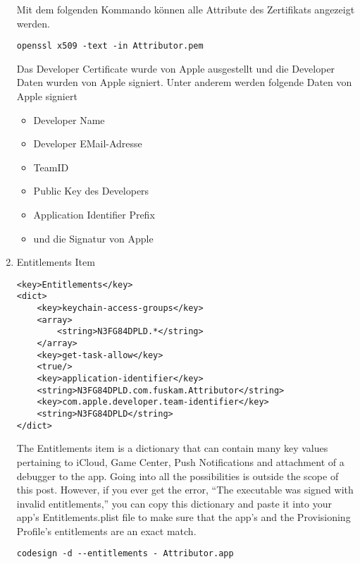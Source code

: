 \begin{enumerate}
Mit dem folgenden Kommando können alle Attribute des Zertifikats angezeigt werden.
\lstset{
    language=bash,
    }
\begin{lstlisting}[caption={openssl command to encode the developer certificate}]
openssl x509 -text -in Attributor.pem 
\end{lstlisting}

 

Das Developer Certificate wurde von Apple ausgestellt und die Developer Daten wurden von Apple signiert.
Unter anderem werden folgende Daten von Apple signiert
\begin{itemize}
    \item Developer Name
    \item Developer EMail-Adresse
    \item TeamID
    \item Public Key des Developers
    \item Application Identifier Prefix
    \item und die Signatur von Apple
\end{itemize}

    \item Entitlements Item
\begin{lstlisting}[caption={Entitlements Item}]
<key>Entitlements</key>
<dict>
    <key>keychain-access-groups</key>
    <array>
        <string>N3FG84DPLD.*</string>           
    </array>
    <key>get-task-allow</key>
    <true/>
    <key>application-identifier</key>
    <string>N3FG84DPLD.com.fuskam.Attributor</string>
    <key>com.apple.developer.team-identifier</key>
    <string>N3FG84DPLD</string>
</dict>
\end{lstlisting}

The Entitlements item is a dictionary that can contain many key values pertaining to iCloud, Game Center, Push Notifications and attachment of a debugger to the app. Going into all the possibilities is outside the scope of this post. However, if you ever get the error, “The executable was signed with invalid entitlements,” you can copy this dictionary and paste it into your app’s Entitlements.plist file to make sure that the app’s and the Provisioning Profile’s entitlements are an exact match.

\begin{lstlisting}[caption={codesign command zeigte alle entitlements einer App}]
codesign -d --entitlements - Attributor.app
\end{lstlisting}


\end{enumerate}
